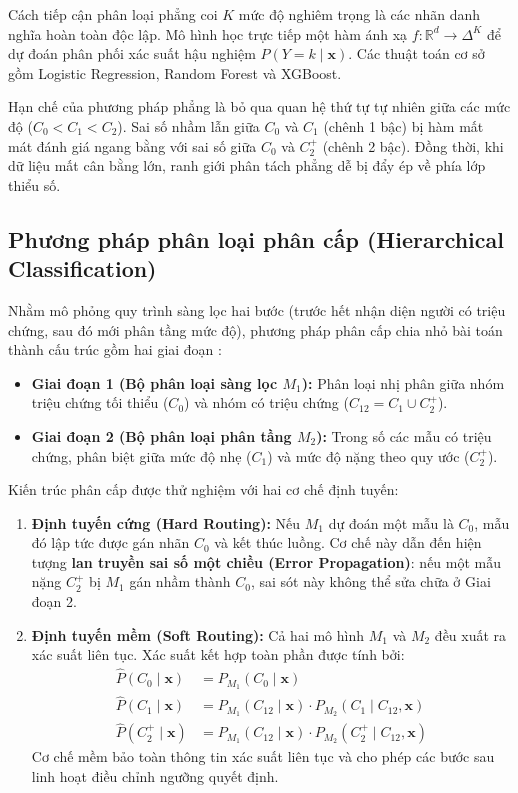 Cách tiếp cận phân loại phẳng coi $K$ mức độ nghiêm trọng là các nhãn danh nghĩa hoàn toàn độc lập. Mô hình học trực tiếp một hàm ánh xạ $f: \mathbb{R}^d \to \Delta^K$ để dự đoán phân phối xác suất hậu nghiệm $P(Y = k \mid \mathbf{x})$. Các thuật toán cơ sở gồm Logistic Regression, Random Forest và XGBoost.

Hạn chế của phương pháp phẳng là bỏ qua quan hệ thứ tự tự nhiên giữa các mức độ ($C_0 < C_1 < C_2$). Sai số nhầm lẫn giữa $C_0$ và $C_1$ (chênh 1 bậc) bị hàm mất mát đánh giá ngang bằng với sai số giữa $C_0$ và $C_2^+$ (chênh 2 bậc). Đồng thời, khi dữ liệu mất cân bằng lớn, ranh giới phân tách phẳng dễ bị đẩy ép về phía lớp thiểu số.

\subsection{Phương pháp phân loại phân cấp (Hierarchical Classification)}
\label{subsec:hierarchical-paradigm}

Nhằm mô phỏng quy trình sàng lọc hai bước (trước hết nhận diện người có triệu chứng, sau đó mới phân tầng mức độ), phương pháp phân cấp chia nhỏ bài toán thành cấu trúc gồm hai giai đoạn \cite{silla2011survey}:
\begin{itemize}
    \item \textbf{Giai đoạn 1 (Bộ phân loại sàng lọc $M_1$):} Phân loại nhị phân giữa nhóm triệu chứng tối thiểu ($C_0$) và nhóm có triệu chứng ($C_{12} = C_1 \cup C_2^+$).
    \item \textbf{Giai đoạn 2 (Bộ phân loại phân tầng $M_2$):} Trong số các mẫu có triệu chứng, phân biệt giữa mức độ nhẹ ($C_1$) và mức độ nặng theo quy ước ($C_2^+$).
\end{itemize}

Kiến trúc phân cấp được thử nghiệm với hai cơ chế định tuyến:
\begin{enumerate}
    \item \textbf{Định tuyến cứng (Hard Routing):} Nếu $M_1$ dự đoán một mẫu là $C_0$, mẫu đó lập tức được gán nhãn $C_0$ và kết thúc luồng. Cơ chế này dẫn đến hiện tượng \textbf{lan truyền sai số một chiều (Error Propagation)}: nếu một mẫu nặng $C_2^+$ bị $M_1$ gán nhầm thành $C_0$, sai sót này không thể sửa chữa ở Giai đoạn 2.
    \item \textbf{Định tuyến mềm (Soft Routing):} Cả hai mô hình $M_1$ và $M_2$ đều xuất ra xác suất liên tục. Xác suất kết hợp toàn phần được tính bởi:
    \begin{align}
        \hat{P}(C_0 \mid \mathbf{x}) &= P_{M_1}(C_0 \mid \mathbf{x}) \\
        \hat{P}(C_1 \mid \mathbf{x}) &= P_{M_1}(C_{12} \mid \mathbf{x}) \cdot P_{M_2}(C_1 \mid C_{12}, \mathbf{x}) \\
        \hat{P}(C_2^+ \mid \mathbf{x}) &= P_{M_1}(C_{12} \mid \mathbf{x}) \cdot P_{M_2}(C_2^+ \mid C_{12}, \mathbf{x})
    \end{align}
    Cơ chế mềm bảo toàn thông tin xác suất liên tục và cho phép các bước sau linh hoạt điều chỉnh ngưỡng quyết định.
\end{enumerate}


